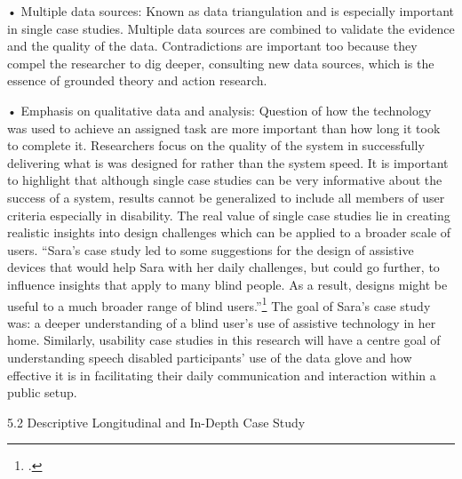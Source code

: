•	Multiple data sources: Known as data triangulation and is especially important in single case studies. Multiple data sources are combined to validate the evidence and the quality of the data. Contradictions are important too because they compel the researcher to dig deeper, consulting new data sources, which is the essence of grounded theory and action research.

•	Emphasis on qualitative data and analysis: Question of how the technology was used to achieve an assigned task are more important than how long it took to complete it. Researchers focus on the quality of the system in successfully delivering what is was designed for rather than the system speed. 
It is important to highlight that although single case studies can be very informative about the success of a system, results cannot be generalized to include all members of user criteria especially in disability. The real value of single case studies lie in creating realistic insights into design challenges which can be applied to a broader scale of users. 
“Sara’s case study led to some suggestions for the design of assistive devices that would help Sara with her daily challenges, but could go further, to influence insights that apply to many blind people.  As a result, designs might be useful to a much broader range of blind users.”\footcite{Shinohara2009} 
The goal of Sara’s case study was: a deeper understanding of a blind user’s use of assistive technology in her home.  Similarly, usability case studies in this research will have a centre goal of understanding speech disabled participants’ use of the data glove and how effective it is in facilitating their daily communication and interaction within a public setup. 

5.2 Descriptive Longitudinal and In-Depth Case Study

